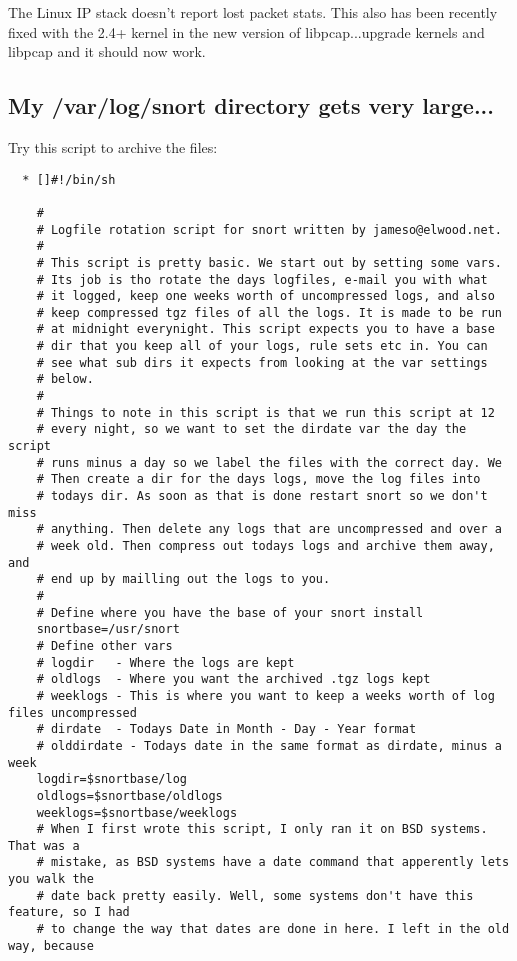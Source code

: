 \documentclass{article}
\begin{document}
The Linux IP stack doesn't report lost packet stats. This also has been
recently fixed with the 2.4+ kernel in the new version of libpcap...upgrade
kernels and libpcap and it should now work.

\subsection{My /var/log/snort directory gets very large...}

Try this script to archive the files:

\begin{verbatim}
  * []#!/bin/sh

    # 
    # Logfile rotation script for snort written by jameso@elwood.net.
    # 
    # This script is pretty basic. We start out by setting some vars.
    # Its job is tho rotate the days logfiles, e-mail you with what 
    # it logged, keep one weeks worth of uncompressed logs, and also
    # keep compressed tgz files of all the logs. It is made to be run
    # at midnight everynight. This script expects you to have a base
    # dir that you keep all of your logs, rule sets etc in. You can 
    # see what sub dirs it expects from looking at the var settings
    # below.
    # 
    # Things to note in this script is that we run this script at 12 
    # every night, so we want to set the dirdate var the day the script
    # runs minus a day so we label the files with the correct day. We
    # Then create a dir for the days logs, move the log files into 
    # todays dir. As soon as that is done restart snort so we don't miss
    # anything. Then delete any logs that are uncompressed and over a
    # week old. Then compress out todays logs and archive them away, and
    # end up by mailling out the logs to you.
    #
    # Define where you have the base of your snort install
    snortbase=/usr/snort
    # Define other vars
    # logdir   - Where the logs are kept
    # oldlogs  - Where you want the archived .tgz logs kept
    # weeklogs - This is where you want to keep a weeks worth of log files uncompressed
    # dirdate  - Todays Date in Month - Day - Year format
    # olddirdate - Todays date in the same format as dirdate, minus a week
    logdir=$snortbase/log
    oldlogs=$snortbase/oldlogs
    weeklogs=$snortbase/weeklogs
    # When I first wrote this script, I only ran it on BSD systems. That was a
    # mistake, as BSD systems have a date command that apperently lets you walk the
    # date back pretty easily. Well, some systems don't have this feature, so I had
    # to change the way that dates are done in here. I left in the old way, because

\end{verbatim}
\end{document}
